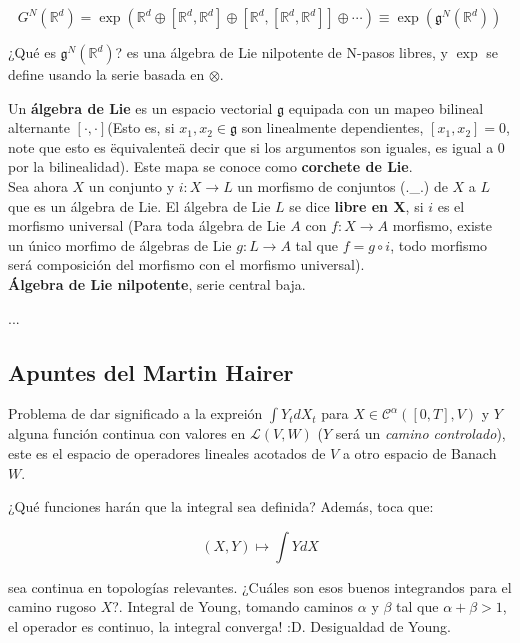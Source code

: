 \[
	G^N (\mathbb{R}^d) = \exp \left( \mathbb{R}^d \oplus \left[ \mathbb{R}^d, \mathbb{R}^d \right] \oplus \left[ \mathbb{R}^d, \left[ \mathbb{R}^d, \mathbb{R}^d \right] \right] \oplus \cdots \right) \equiv \exp( \mathfrak{g}^N (\mathbb{R}^d) )
\]

¿Qué es $\mathfrak{g}^N (\mathbb{R}^d)$? es una álgebra de Lie nilpotente de N-pasos libres, y $\exp$ se define usando la serie basada en $\otimes$.

\begin{boxDef}
	Un \textbf{álgebra de Lie} es un espacio vectorial $\mathfrak{g}$ equipada con un mapeo bilineal alternante $[\cdot, \cdot] $(Esto es, si $x_1, x_2 \in \mathfrak{g}$ son linealmente dependientes, $[x_1, x_2] = 0$, note que esto es \"equivalente\" a decir que si los argumentos son iguales, es igual a 0 por la bilinealidad). Este mapa se conoce como \textbf{corchete de Lie}. \\

	Sea ahora $X$ un conjunto y $i: X \rightarrow L$ un morfismo de conjuntos (.\_.) de $X$ a $L$ que es un álgebra de Lie. El álgebra de Lie $L$ se dice \textbf{libre en X}, si $i$ es el morfismo universal (Para toda álgebra de Lie $A$ con $f: X \rightarrow A$ morfismo, existe un único morfimo de álgebras de Lie $g: L \rightarrow A$ tal que $f = g \circ i$, todo morfismo será composición del morfismo con el morfismo universal). \\

	\textbf{Álgebra de Lie nilpotente}, serie central baja.
\end{boxDef}


...



\subsection{Apuntes del Martin Hairer}

Problema de dar significado a la expreión $\int Y_t dX_t$ para $X \in \mathscr{C}^{\alpha} ([0,T], V)$ y $Y$ alguna función continua con valores en $\mathcal{L}(V,W)$ ($Y$ será un \textit{camino controlado}), este es el espacio de operadores lineales acotados de $V$ a otro espacio de Banach $W$. 

¿Qué funciones harán que la integral sea definida? Además, toca que:

\[
	(X,Y) \mapsto \int Y dX
\]

sea continua en topologías relevantes. ¿Cuáles son esos buenos integrandos para el camino rugoso $X$?. Integral de Young, tomando caminos $\alpha$ y $\beta$ tal que $\alpha + \beta > 1$, el operador es continuo, la integral converga! :D. Desigualdad de Young. 


